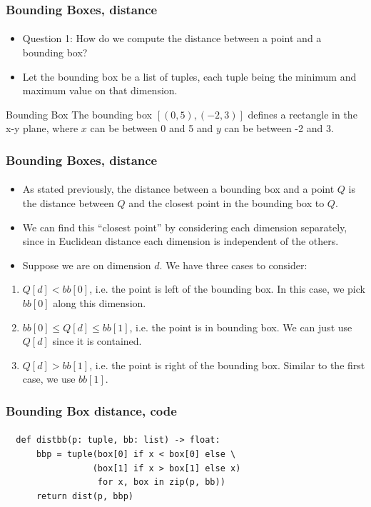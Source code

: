 \documentclass{beamer}                             %
\begin{document}
\begin{frame}
\frametitle{Bounding Boxes, distance}
\framesubtitle{}
\begin{itemize}
  \item Question 1: How do we compute the
    distance between a point and a bounding box?
  \item Let the bounding box be a list of tuples, each tuple
    being the minimum and maximum value on that dimension.
\end{itemize}
\begin{exampleblock}{Bounding Box}
  The bounding box \( [(0, 5), (-2, 3)] \) defines a rectangle in the x-y plane,
  where \( x \) can be between 0 and 5 and \( y \) can be between -2 and 3.
\end{exampleblock}
\end{frame}

\begin{frame}
\frametitle{Bounding Boxes, distance}
\framesubtitle{}
\begin{itemize}
  \item As stated previously, the distance between a bounding
    box and a point \( Q \) is the distance between \( Q \)
    and the closest point in the bounding box to \( Q \).
  \item We can find this \enquote{closest point} by considering
    each dimension separately, since in Euclidean distance
    each dimension is independent of the others. \pause
  \item Suppose we are on dimension \( d \). We have three cases to consider:
\end{itemize}
\begin{enumerate}
  \item \( Q[d] < bb[0] \), i.e. the point is left of the bounding box.
    In this case, we pick \( bb[0] \) along this dimension.
  \item \( bb[0] \leq Q[d] \leq bb[1] \), i.e. the point is in bounding box.
    We can just use \( Q[d] \) since it is contained.
  \item \( Q[d] > bb[1] \), i.e. the point is right of the bounding box.
    Similar to the first case, we use \( bb[1] \). 
\end{enumerate}

\end{frame}

\begin{frame}[fragile]
\frametitle{Bounding Box distance, code}
\framesubtitle{}
\begin{verbatim}
  def distbb(p: tuple, bb: list) -> float:
      bbp = tuple(box[0] if x < box[0] else \
                 (box[1] if x > box[1] else x)
                  for x, box in zip(p, bb))
      return dist(p, bbp)
\end{verbatim}
\end{frame}
\end{document}
